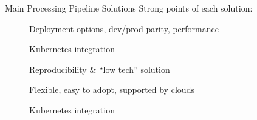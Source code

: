 \begin{frame}{Main Processing Pipeline Solutions}
  Strong points of each solution:
  
  \begin{description}
    \item[] Deployment options, dev/prod parity, performance
    \item[] Kubernetes integration
    \item[] Reproducibility \& “low tech” solution
    \item[] Flexible, easy to adopt, supported by clouds
    \item[] Kubernetes integration
  \end{description}
\end{frame}
